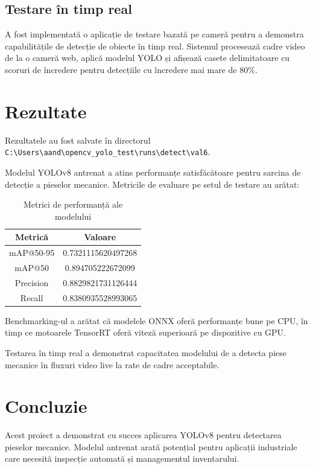\documentclass[12pt,a4paper]{article}
\begin{document}
\subsection{Testare în timp real}

A fost implementată o aplicație de testare bazată pe cameră pentru a demonstra capabilitățile de detecție de obiecte în timp real. Sistemul procesează cadre video de la o cameră web, aplică modelul YOLO și afișează casete delimitatoare cu scoruri de încredere pentru detecțiile cu încredere mai mare de 80\%.

\section{Rezultate}

Rezultatele au fost salvate în directorul \texttt{C:\textbackslash Users\textbackslash aand\textbackslash opencv\_yolo\_test\textbackslash runs\textbackslash detect\textbackslash val6}.

Modelul YOLOv8 antrenat a atins performanțe satisfăcătoare pentru sarcina de detecție a pieselor mecanice. Metricile de evaluare pe setul de testare au arătat:

\begin{table}[H]
\centering
\begin{tabular}{|c|c|}
\hline
Metrică & Valoare \\
\hline
mAP@50-95 & 0.7321115620497268 \\
\hline
mAP@50 & 0.894705222672099 \\
\hline
Precision & 0.8829821731126444 \\
\hline
Recall & 0.8380935528993065 \\
\hline
\end{tabular}
\caption{Metrici de performanță ale modelului}
\end{table}

Benchmarking-ul a arătat că modelele ONNX oferă performanțe bune pe CPU, în timp ce motoarele TensorRT oferă viteză superioară pe dispozitive cu GPU.

Testarea în timp real a demonstrat capacitatea modelului de a detecta piese mecanice în fluxuri video live la rate de cadre acceptabile.

\section{Concluzie}

Acest proiect a demonstrat cu succes aplicarea YOLOv8 pentru detectarea pieselor mecanice. Modelul antrenat arată potențial pentru aplicații industriale care necesită inspecție automată și managementul inventarului.
\end{document}
